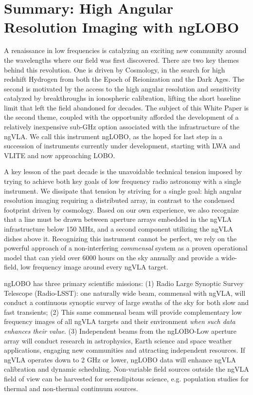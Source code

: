 \documentclass[11pt]{article}
\begin{document}
\section{Summary: High Angular Resolution Imaging with ngLOBO}
\vspace{-0.25cm}

A renaissance in low frequencies is catalyzing an exciting new community around the wavelengths where our field was first discovered. There are two key themes behind this revolution. One is driven by Cosmology, in the search for high redshift Hydrogen from both the Epoch of Reionization and the Dark Ages. The second is motivated by the access to the high angular resolution and sensitivity catalyzed by breakthroughs in ionospheric calibration, lifting the short baseline limit that left the field abandoned for decades. The subject of this White Paper is the second theme, coupled with the opportunity afforded the development of a relatively inexpensive sub-GHz option associated with the infrastructure of the ngVLA. We call this instrument ngLOBO, as the hoped for last step in a succession of instruments currently under development, starting with LWA and VLITE and now approaching LOBO. 

A key lesson of the past decade is the unavoidable technical tension imposed by trying to achieve both key goals of low frequency radio astronomy with a single instrument. We dissipate that tension by striving for a single goal: high angular resolution imaging requiring a distributed array, in contrast to the condensed footprint driven by cosmology. Based on our own experience, we also recognize that a line must be drawn between aperture arrays embedded in the ngVLA infrastructure below 150 MHz, and a second component utilizing the ngVLA dishes above it. Recognizing this instrument cannot be perfect, we rely on the powerful approach of a non-interfering {\it commensal} system as a proven operational model that can yield over 6000 hours on the sky annually and provide a wide-field, low frequency image around every ngVLA target.

ngLOBO has three primary scientific missions: (1) Radio Large Synoptic Survey Telescope (Radio-LSST): one naturally wide beam, commensal with ngVLA, will conduct a continuous synoptic survey of large swaths of the sky for both slow and fast transients; (2) This same commensal beam will provide complementary low frequency images of all ngVLA targets and their environment {\it when such data enhances their value}. (3) Independent beams from the ngLOBO-Low aperture array will conduct research in astrophysics, Earth science and space weather applications, engaging new communities and attracting independent resources. If ngVLA operates down to 2 GHz or lower, ngLOBO data will enhance ngVLA calibration and dynamic scheduling. Non-variable field sources outside the ngVLA field of view can be harvested for serendipitous science, e.g. population studies for thermal and non-thermal continuum sources.
\end{document}

